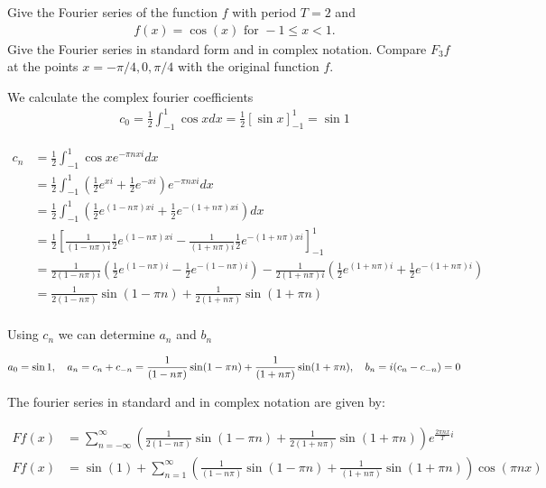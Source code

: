\documentclass[11pt]{article}
\begin{document}
\begin{exercise}
    Give the Fourier series of the function $f$ with period $T = 2$ and 
    \begin{gather*}
        f(x) = \cos(x) \text{ for } -1 \leq x < 1.
    \end{gather*}
    Give the Fourier series in standard form and in complex notation. 
    Compare $F_3 f$ at the points $x = -\pi/4, 0, \pi/4$ with the original function $f$.
\end{exercise}
\begin{solution}    
We calculate the complex fourier coefficients 
\begin{align*}
c_0 = \frac 1 2 \int_{-1}^1 \cos x dx = \frac 1 2 [\sin x]_{-1}^1 = \sin 1
\end{align*}

\begin{align*}
c_n &= \frac 1 2 \int_{-1}^1 \cos x e^{-\pi n x i} dx\\
&= \frac 1 2 \int_{-1}^1 \left(\frac 1 2 e^{x i} + \frac 1 2 e^{-x i} \right) e^{-\pi n x i} dx\\
&= \frac 1 2 \int_{-1}^1 \left(\frac 1 2 e^{(1-n\pi)x i} + \frac 1 2 e^{-(1+n\pi)x i} \right) dx\\
&= \frac 1 2\left[\frac{1}{(1-n\pi) i}\frac 1 2 e^{(1-n\pi)x i} - \frac{1}{(1+n\pi) i}\frac 1 2 e^{-(1+n\pi)x i} \right]_{-1}^1\\
&= \frac{1}{2(1-n\pi) i}\left( \frac 1 2 e^{(1-n\pi)i}- \frac 1 2 e^{-(1-n\pi) i}\right) - \frac{1}{2(1+n\pi) i}\left( \frac 1 2 e^{(1+n\pi)i}+ \frac 1 2 e^{-(1+n\pi) i}\right)\\
&= \frac{1}{2(1-n\pi)}\sin(1-\pi n) + \frac{1}{2(1+n\pi)}\sin(1+\pi n)\\
\end{align*}

Using $c_n$ we can determine $a_n$ and $b_n$

$$
a_0 = \sin 1,\quad a_n = c_n + c_{-n} = \frac{1}{(1-n\pi)}\sin(1-\pi n) + \frac{1}{(1+n\pi)}\sin(1+\pi n)\\, \quad b_n = i(c_n - c_{-n}) = 0
$$

The fourier series in standard and in complex notation are given by:

\begin{align*}
F f(x)&=\sum_{n=-\infty}^{\infty} \left(\frac{1}{2(1-n\pi)}\sin(1-\pi n) + \frac{1}{2(1+n\pi)}\sin(1+\pi n)\right) e^{\frac{2 \pi n x}{T} i}\\
F f(x)&=\sin(1)+\sum_{n=1}^{\infty} \left(  \frac{1}{(1-n\pi) }\sin(1-\pi n) + \frac{1}{(1+n\pi)}\sin(1+\pi n) \right) \cos \left(\pi n x\right)
\end{align*}


\end{solution}
\end{document}
